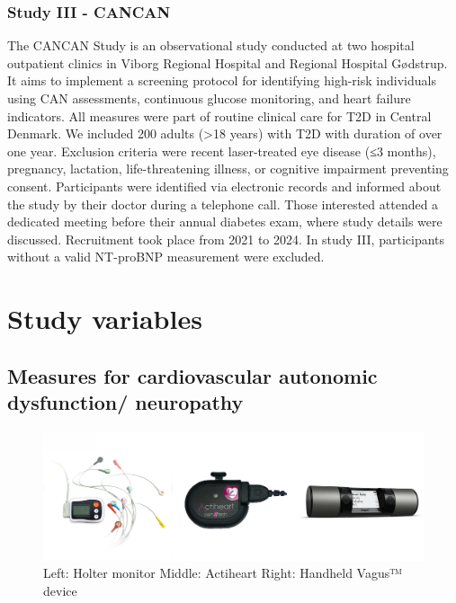 \documentclass[
  a4paper,
  headsepline=true,
  open=any]{scrbook}
\begin{document}
\hypertarget{study-iii---cancan}{%
\subsubsection{Study III - CANCAN}\label{study-iii---cancan}}

The CANCAN Study is an observational study conducted at two hospital
outpatient clinics in Viborg Regional Hospital and Regional Hospital
Gødstrup. It aims to implement a screening protocol for identifying
high-risk individuals using CAN assessments, continuous glucose
monitoring, and heart failure indicators. All measures were part of
routine clinical care for T2D in Central Denmark. We included 200 adults
(\textgreater18 years) with T2D with duration of over one year.
Exclusion criteria were recent laser-treated eye disease (≤3 months),
pregnancy, lactation, life-threatening illness, or cognitive impairment
preventing consent. Participants were identified via electronic records
and informed about the study by their doctor during a telephone call.
Those interested attended a dedicated meeting before their annual
diabetes exam, where study details were discussed. Recruitment took
place from 2021 to 2024. In study III, participants without a valid
NT-proBNP measurement were excluded.

\hypertarget{study-variables}{%
\section{Study variables}\label{study-variables}}

\hypertarget{measures-for-cardiovascular-autonomic-dysfunction-neuropathy}{%
\subsection{Measures for cardiovascular autonomic dysfunction/
neuropathy}\label{measures-for-cardiovascular-autonomic-dysfunction-neuropathy}}

\begin{figure}

{\centering \includegraphics[width=5in,height=\textheight]{images/can_tools.pdf}

}

\caption{Left: Holter monitor Middle: Actiheart Right: Handheld Vagus™
device}

\end{figure}
\end{document}

